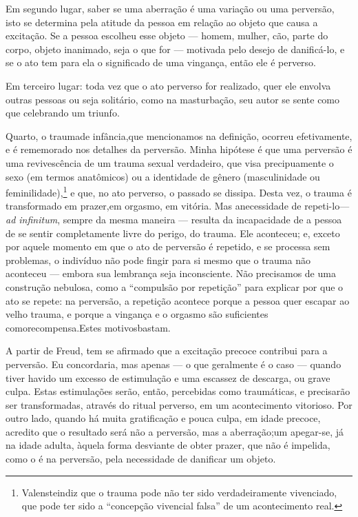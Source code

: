 Em segundo lugar, saber se uma aberração é uma variação\idxvariadefi{} ou uma
perversão, isto se determina pela atitude da pessoa em relação ao
objeto que causa a excitação. Se a pessoa escolheu esse objeto --- homem,
mulher, cão, parte do corpo, objeto inanimado, seja o que for ---
motivada pelo desejo de danificá-lo, e se o ato tem para ela o
significado de uma vingança,\idxvinga{} então ele é perverso.

Em terceiro lugar: toda vez que o ato perverso for realizado, quer
ele envolva outras pessoas ou seja solitário, como na masturbação, seu
autor se sente como que celebrando um triunfo.

Quarto, o trauma\idxtrauma[|(] de infância,\idxinfan[|(] que mencionamos na definição, ocorreu
efetivamente, e é rememorado nos detalhes da perversão. Minha hipótese
é que uma perversão é uma revivescência de um trauma sexual verdadeiro,
que visa precipuamente o sexo (em termos anatômicos) ou a identidade de
gênero (masculinidade ou feminilidade),\footnote{ Valenstein\idxvalen[|nn] diz que o
trauma pode não ter sido verdadeiramente vivenciado, que pode ter sido
a ``concepção vivencial falsa'' de um
acontecimento real.} e que, no ato perverso, o passado se dissipa.
Desta vez, o trauma é transformado em prazer,\idxfantapraz[|(] em orgasmo, em vitória.
Mas a\idxtraumanece[|(] necessidade de repeti-lo\idxpervrepet[|(] --- \textit{ad infinitum}, sempre da mesma
maneira --- resulta da incapacidade de a pessoa de se sentir
completamente livre do perigo, do trauma. Ele aconteceu; e, exceto por
aquele momento em que o ato de perversão é repetido, e se processa sem
problemas, o indivíduo não pode fingir para si mesmo que o trauma não
aconteceu --- embora sua lembrança seja inconsciente. Não precisamos de
uma construção nebulosa, como a ``compulsão por
repetição'' para explicar por que o ato se repete: na
perversão, a repetição acontece porque a pessoa quer escapar ao velho
trauma, e porque a vingança\idxvinga{} e o orgasmo são suficientes como\idxtrauma[|)]
recompensa.\idxpervrepet[|)] Estes motivos\idxtraumanece[|)] bastam.

A partir de Freud, tem se afirmado que a\idxsexueinf{} excitação precoce\idxinfanexcit{}
contribui para a perversão. Eu concordaria, mas apenas --- o que
geralmente é o caso --- quando tiver havido um excesso de estimulação e
uma escassez de descarga, ou grave culpa. Estas estimulações serão,
então, percebidas como traumáticas, e precisarão ser transformadas,
através do ritual perverso, em um acontecimento vitorioso. Por outro
lado, quando há muita gratificação e pouca culpa, em idade precoce,
acredito que o resultado será não a perversão, mas a aberração;\idxinfan[|)] um
apegar-se, já na idade adulta, àquela forma desviante de obter prazer,
que não é impelida, como o é na perversão, pela necessidade de
danificar um objeto.

